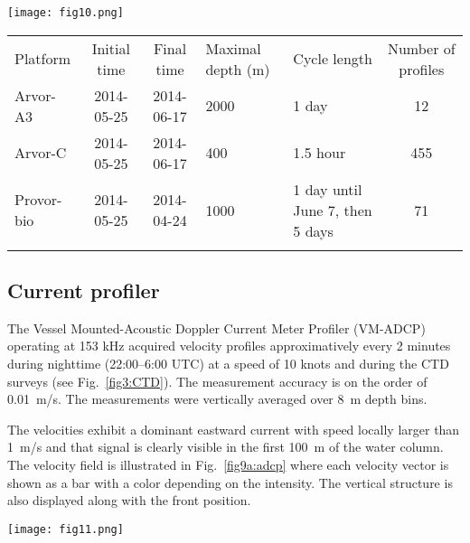 \documentclass[essd,manuscript]{copernicus}
\begin{document}
\begin{figure*}[h]
\texttt{[image: fig10.png]}
\caption{Profiling floats trajectories (top-left panel) and salinity from May 25 to June 15, 2014. \label{fig8:argofloats}}
\end{figure*}


\begin{table*}[htpb]
\caption{Characteristics of the profiling floats.\label{tab:argofloats}}
\begin{tabular}{lccllc}
\tophline
Platform 			& Initial time	& Final time	& Maximal depth (m)		& Cycle length & Number of profiles \\
\middlehline
Arvor-A3			& 2014-05-25	& 2014-06-17	& 2000		& 1 day 	& 12 							\\ 
Arvor-C				& 2014-05-25	& 2014-06-17	& 400		& 1.5 hour	& 455				\\ 
Provor-bio			& 2014-05-25	& 2014-04-24	& 1000		& 1 day until June 7, then 5 days	& 71	\\ 
\bottomhline
\end{tabular}
\end{table*}

\subsection{Current profiler\label{sec:adcp}}

The Vessel Mounted-Acoustic Doppler Current Meter Profiler (VM-ADCP) operating at 153 kHz acquired velocity profiles approximatively every 2 minutes during nighttime (22:00--6:00 UTC) at a speed of 10 knots and during the CTD surveys (see Fig.~\ref{fig3:CTD}). The measurement accuracy is on the order of 0.01~m/s. The measurements were vertically averaged over 8~m depth bins.

The velocities exhibit a dominant eastward current with speed locally larger than 1~m/s and that signal is clearly visible in the first 100~m of the water column. The velocity field is illustrated in Fig.~\ref{fig9a:adcp} where each velocity vector is shown as a bar with a color depending on the intensity. The vertical structure is also displayed along with the front position.

\begin{figure*}[h]
\texttt{[image: fig11.png]}
\caption{Velocity field obtained with the ADCP at a 40~m depth (left panel) and sections of zonal velocity on May 26 (S1) and 27 (S2). The locations of the sections are indicated by dashed rectangles on the map. Only data with a quality flag equal to 1 (good data) are represented\label{fig9a:adcp}}
\end{figure*}
\end{document}
